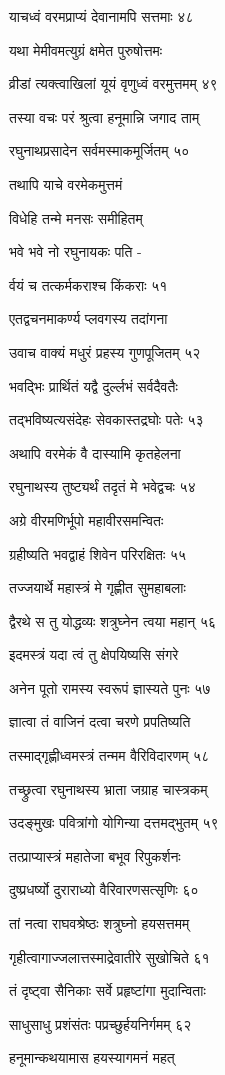याचध्वं वरमप्राप्यं देवानामपि सत्तमाः ४८

यथा मेमीवमत्युग्रं क्षमेत पुरुषोत्तमः

व्रीडां त्यक्त्वाखिलां यूयं वृणुध्वं वरमुत्तमम् ४९

तस्या वचः परं श्रुत्वा हनूमान्नि जगाद ताम्

रघुनाथप्रसादेन सर्वमस्माकमूर्जितम् ५०

तथापि याचे वरमेकमुत्तमं

विधेहि तन्मे मनसः समीहितम्

भवे भवे नो रघुनायकः पति -

र्वयं च तत्कर्मकराश्च किंकराः ५१

एतद्वचनमाकर्ण्य प्लवगस्य तदांगना

उवाच वाक्यं मधुरं प्रहस्य गुणपूजितम् ५२

भवद्भिः प्रार्थितं यद्वै दुर्ल्लभं सर्वदैवतैः

तद्भविष्यत्यसंदेहः सेवकास्तद्रघोः पतेः ५३

अथापि वरमेकं वै दास्यामि कृतहेलना

रघुनाथस्य तुष्ट्यर्थं तदृतं मे भवेद्वचः ५४

अग्रे वीरमणिर्भूपो महावीरसमन्वितः

ग्रहीष्यति भवद्वाहं शिवेन परिरक्षितः ५५

तज्जयार्थे महास्त्रं मे गृह्णीत सुमहाबलाः

द्वैरथे स तु योद्धव्यः शत्रुघ्नेन त्वया महान् ५६

इदमस्त्रं यदा त्वं तु क्षेपयिष्यसि संगरे

अनेन पूतो रामस्य स्वरूपं ज्ञास्यते पुनः ५७

ज्ञात्वा तं वाजिनं दत्वा चरणे प्रपतिष्यति

तस्माद्गृह्णीध्वमस्त्रं तन्मम वैरिविदारणम् ५८

तच्छ्रुत्वा रघुनाथस्य भ्राता जग्राह चास्त्रकम्

उदङ्मुखः पवित्रांगो योगिन्या दत्तमद्भुतम् ५९

तत्प्राप्यास्त्रं महातेजा बभूव रिपुकर्शनः

दुष्प्रधर्ष्यो दुराराध्यो वैरिवारणसत्सृणिः ६०

तां नत्वा राघवश्रेष्ठः शत्रुघ्नो हयसत्तमम्

गृहीत्वागाज्जलात्तस्माद्रेवातीरे सुखोचिते ६१

तं दृष्ट्वा सैनिकाः सर्वे प्रहृष्टांगा मुदान्विताः

साधुसाधु प्रशंसंतः पप्रच्छुर्हयनिर्गमम् ६२

हनूमान्कथयामास हयस्यागमनं महत्


